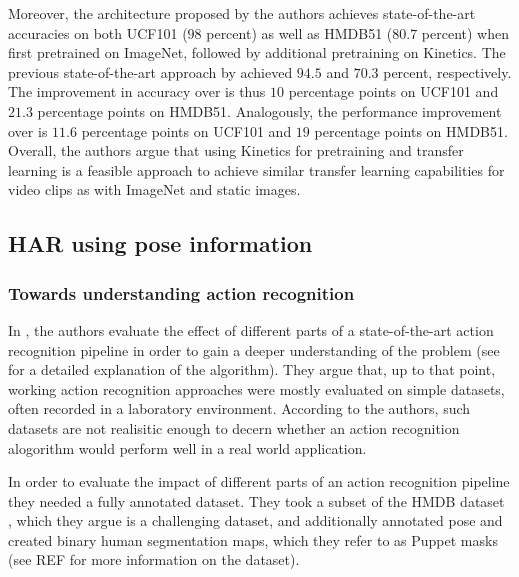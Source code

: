 Moreover, the architecture proposed by the authors achieves state-of-the-art accuracies on both UCF101 ($98$ percent) as well as HMDB51 ($80.7$ percent) when first pretrained on ImageNet, followed by additional pretraining on Kinetics.
The previous state-of-the-art approach by \cite{feichtenhofer_spatiotemporal_2016} achieved $94.5$ and $70.3$ percent, respectively.
The improvement in accuracy over \cite{simonyan_two-stream_2014} is thus $10$ percentage points on UCF101 and $21.3$ percentage points on HMDB51.
Analogously, the performance improvement over \cite{wang_action_2013} is $11.6$ percentage points on UCF101 and $19$ percentage points on HMDB51.
Overall, the authors argue that using Kinetics for pretraining and transfer learning is a feasible approach to achieve similar transfer learning capabilities for video clips as with ImageNet and static images.

\subsection{HAR using pose information}
\label{sec:jhuang-towards}
\subsubsection{Towards understanding action recognition}
In \cite{jhuang_towards_2013}, the authors evaluate the effect of different parts of a state-of-the-art action recognition pipeline \cite{wang_dense_2013} in order to gain a deeper understanding of the problem (see  for a detailed explanation of the algorithm).
They argue that, up to that point, working action recognition approaches were mostly evaluated on simple datasets, often recorded in a laboratory environment.
According to the authors, such datasets are not realisitic enough to decern whether an action recognition alogorithm would perform well in a real world application.

In order to evaluate the impact of different parts of an action recognition pipeline they needed a fully annotated dataset.
They took a subset of the HMDB dataset \cite{kuehne_hmdb:_2011}, which they argue is a challenging dataset, and additionally annotated pose and created binary human segmentation maps, which they refer to as Puppet masks (see REF for more information on the dataset). %

